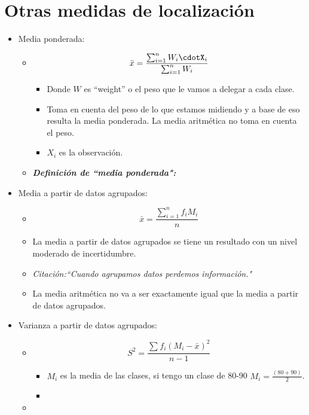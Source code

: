 \section{Otras medidas de localización}
\begin{itemize}
    \item Media ponderada: 
        \begin{itemize}
            \item \[
              \bar{x} = \frac{\sum_{i=1}^{n}W_i\cdotX_i} {\sum_{i=1}^{n}W_i} 
            \]
            \begin{itemize}
                \item Donde $W$ es ``weight'' o el peso que le vamos a delegar a cada clase.
                \item Toma en cuenta del peso de lo que estamos midiendo y a base de eso resulta la media ponderada. La media aritmética no toma en cuenta el peso.
                \item $X_i$ es la observación.
            \end{itemize}            
            \item \emph{\textbf{Definición de ``media ponderada":} }
        \end{itemize}
    \item Media a partir de datos agrupados: 
        \begin{itemize}
            \item \[
              \bar{x} = \frac{\sum_{i=1}^{n}f_iM_i}{n} 
            \]
            
            \item La media a partir de datos agrupados se tiene un resultado con un nivel moderado de incertidumbre. 
            \item \emph{Citación:``Cuando agrupamos datos perdemos información."}         
            \item La media aritmética no va a ser exactamente igual que la media a partir de datos agrupados.   
        \end{itemize}
    
    \item Varianza a partir de datos agrupados: 
        \begin{itemize}
            \item \[
              S^2= \frac{\sum_{}^{}f_i(M_i-\bar{x})^2}{n-1} 
            \]
                \begin{itemize}
                    \item $M_i$ es la media de las clases, si tengo un clase de 80-90 $M_i = \frac{(80+90)}{2}$.
                    \item  
                \end{itemize}
            \item 
        \end{itemize}
\end{itemize}

